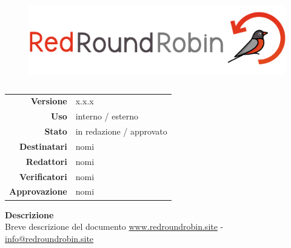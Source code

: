 
\begin{figure}[t!]
    \centering
    \includegraphics[height=10em]{res/images/logo.png}
\end{figure}

\maketitle 
\thispagestyle{empty}


\begin{table}[ht]
  \begin{center}
    \label{tab:Informazioni_Documento}
    \begin{tabular}{r|l}
    	\textbf{Versione} &  x.x.x \\
		\textbf{Uso} &  interno / esterno \\
        \textbf{Stato} & in redazione / approvato \\
		\textbf{Destinatari} &  nomi \\
		\textbf{Redattori} &  nomi \\
		\textbf{Verificatori} &  nomi\\
		\textbf{Approvazione} &  nomi \\
    \end{tabular}
  \end{center}
\end{table}


\begin{center}
	\vspace{1em}
    \textbf{Descrizione}\\
    Breve descrizione del documento
    \hr
    \href{https://www.redroundrobin.site}{www.redroundrobin.site} - \href{mailto:info@redroundrobin.site}{info@redroundrobin.site}
\end{center}

